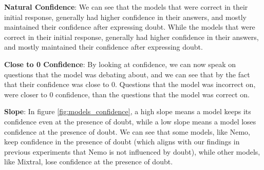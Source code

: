 \textbf{Natural Confidence}: We can see that the models that were correct in their initial response, generally had higher confidence in their answers, and mostly maintained their confidence after expressing doubt. While the models that were correct in their initial response, generally had higher confidence in their answers, and mostly maintained their confidence after expressing doubt.

\textbf{Close to 0 Confidence}: By looking at confidence, we can now speak on questions that the model was debating about, and we can see that by the fact that their confidence was close to 0. Questions that the model was incorrect on, were closer to 0 confidence, than the questions that the model was correct on.

\textbf{Slope}: In figure \ref{fig:models_confidence}, a high slope means a model keeps its confidence even at the presence of doubt, while a low slope means a model loses confidence at the presence of doubt. We can see that some models, like Nemo, keep confidence in the presence of doubt (which aligns with our findings in previous experiments that Nemo is not influenced by doubt), while other models, like Mixtral, lose confidence at the presence of doubt.
